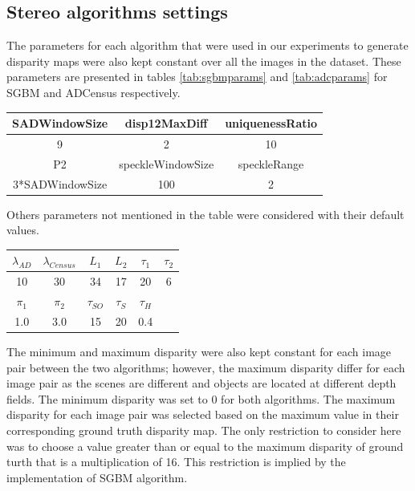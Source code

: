 \subsection{Stereo algorithms settings}
The parameters for each algorithm that were used in our experiments to generate disparity
maps were also kept constant over all the images in the dataset. These parameters are presented in tables \ref{tab:sgbmparams} and \ref{tab:adcparams} 
for SGBM and ADCensus respectively. \newline

{\footnotesize
\begin{minipage}{0.8\linewidth}
\begin{center}
\label{tab:sgbmparams}
\begin{tabular}{ |c|c|c| }
\hline
SADWindowSize & disp12MaxDiff & uniquenessRatio\\  \hline
9 & 2 & 10 \\ \hline
P2 & speckleWindowSize & speckleRange \\ \hline
3*SADWindowSize & 100 & 2  \\ \hline
\end{tabular}
\end{center}
\end{minipage} \newline \newline
}

Others parameters not mentioned in the table were considered with their default values. \newline


{\footnotesize
\begin{minipage}{0.8\linewidth}
\begin{center}
\label{tab:adcparams}
\begin{tabular}{|c|c|c|c|c|c|}
\hline
$\lambda_{AD}$ & $\lambda_{Census}$ & $L_{1}$ & $L_{2}$ & $\tau_{1}$ & $\tau_{2}$ \\  \hline
10 & 30 & 34 & 17 & 20 & 6  \\ \hline
$\pi_{1}$ & $\pi_{2}$ & $\tau_{SO}$ & $\tau_{S}$ & $\tau_{H}$ & \\  \hline
1.0 & 3.0 & 15 & 20 & 0.4 &  \\ \hline
\end{tabular}
\end{center}
\end{minipage} \newline
}

The minimum and maximum disparity were also kept constant for each image pair between the two algorithms; however, the maximum 
disparity differ for each image pair as the scenes are different
and objects are located at different depth fields.
The minimum disparity was set to $0$ for both algorithms. The maximum disparity for each image pair was selected based on the maximum value in their
corresponding ground truth disparity map. The only restriction to consider here was to choose a value greater than or equal to 
the maximum disparity of ground turth that is a multiplication of 16. This restriction
is implied by the implementation of SGBM algorithm.

